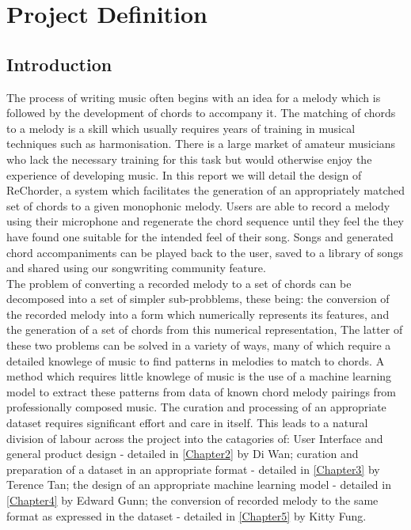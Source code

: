 
\chapter{Project Definition} %

\label{Chapter1} %


\section{Introduction}

The process of writing music often begins with an idea for a melody which is followed by the development of chords to accompany it.
The matching of chords to a melody is a skill which usually requires years of training in musical techniques such as harmonisation.
There is a large market of amateur musicians who lack the necessary training for this task but would otherwise enjoy the experience of developing music.  
In this report we will detail the design of ReChorder, a system which facilitates the generation of an appropriately matched set of chords to a given monophonic melody. \label{Chap1Sec1}
Users are able to record a melody using their microphone and regenerate the chord sequence until they feel the they have found one suitable for the intended feel of their song.
Songs and generated chord accompaniments can be played back to the user, saved to a library of songs and shared using our songwriting community feature. \\
The problem of converting a recorded melody to a set of chords can be decomposed into a set of simpler sub-probblems, these being:
the conversion of the recorded melody into a form which numerically represents its features,
and the generation of a set of chords from this numerical representation,
The latter of these two problems can be solved in a variety of ways, many of which require a detailed knowlege of music to find patterns in melodies to match to chords.  
A method which requires little knowlege of music is the use of a machine learning model to extract these patterns from data of known chord melody pairings from professionally composed music. 
The curation and processing of an appropriate dataset requires significant effort and care in itself.
This leads to a natural division of labour across the project into the catagories of:
\label{sec:Introduction}
User Interface and general product design - detailed in \ref{Chapter2} by Di Wan;
curation and preparation of a dataset in an appropriate format - detailed in \ref{Chapter3} by Terence Tan;
the design of an appropriate machine learning model - detailed in \ref{Chapter4} by Edward Gunn;
the conversion of recorded melody to the same format as expressed in the dataset - detailed in \ref{Chapter5} by Kitty Fung.


